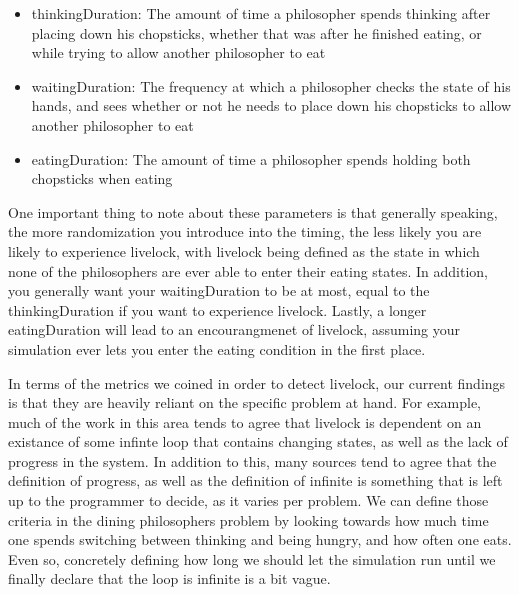 \documentclass{article}
\begin{document}
\begin{itemize}
    \item thinkingDuration: The amount of time a philosopher spends thinking after placing down his chopsticks, whether that was after he finished eating, or while trying to allow another philosopher to eat
    \item waitingDuration: The frequency at which a philosopher checks the state of his hands, and sees whether or not he needs to place down his chopsticks to allow another philosopher to eat
    \item eatingDuration: The amount of time a philosopher spends holding both chopsticks when eating
\end{itemize}

One important thing to note about these parameters is that generally speaking, the more randomization you introduce into 
the timing, the less likely you are likely to experience livelock, with livelock being defined as the state in which 
none of the philosophers are ever able to enter their eating states.  In addition, you generally want your waitingDuration to 
be at most, equal to the thinkingDuration if you want to experience livelock.  Lastly, a longer eatingDuration will lead to 
an encourangmenet of livelock, assuming your simulation ever lets you enter the eating condition in the first place.

In terms of the metrics we coined in order to detect livelock, our current findings is that they are heavily reliant on the 
specific problem at hand.  For example, much of the work in this area tends to agree that livelock is dependent on an 
existance of some infinte loop that contains changing states, as well as the lack of progress in the system.  In addition 
to this, many sources tend to agree that the definition of progress, as well as the definition of infinite is something that 
is left up to the programmer to decide, as it varies per problem.  We can define those criteria in the dining philosophers
problem by looking towards how much time one spends switching between thinking and being hungry, and how often one eats.  Even so, 
concretely defining how long we should let the simulation run until we finally declare that the loop is infinite is a bit vague.  
\end{document}
